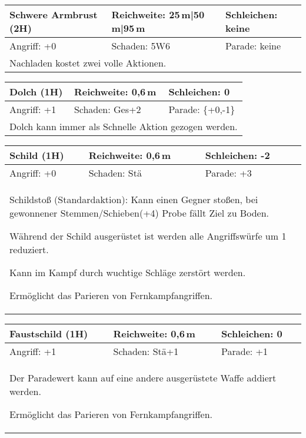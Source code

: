 \documentclass[../../Heldenanleitung2]{subfiles}
\begin{document}
\begin{tabular}{|p{}|p{}|p{}|}
\hline
\textbf{Schwere Armbrust (2H)} & Reichweite: 25\,m|50\,m|95\,m & Schleichen: keine\\
\hline
Angriff: +0 & Schaden: 5W6 & Parade: keine\\
\hline
\multicolumn{3}{|p{0.99\textwidth}|}{Nachladen kostet zwei volle Aktionen.} \\
\hline
\end{tabular}
\newline \newline\newline
\begin{tabular}{|p{}|p{}|p{}|}
\hline
\textbf{Dolch (1H)} & Reichweite: 0,6\,m & Schleichen: 0\\
\hline
Angriff: +1 & Schaden: Ges+2 & Parade: \{+0,-1\}\\
\hline
\multicolumn{3}{|p{0.99\textwidth}|}{Dolch kann immer als Schnelle Aktion gezogen werden.} \\
\hline
\end{tabular}
\newline \newline\newline
\begin{tabular}{|p{}|p{}|p{}|}
\hline
\textbf{Schild (1H)} & Reichweite: 0,6\,m & Schleichen: -2 \\
\hline
Angriff: +0 & Schaden: Stä & Parade: +3\\
\hline
\multicolumn{3}{|p{0.99\textwidth}|}{Schildstoß (Standardaktion): Kann einen Gegner stoßen, bei gewonnener Stemmen/Schieben(+4) Probe fällt Ziel zu Boden. 

Während der Schild ausgerüstet ist werden alle Angriffswürfe um 1 reduziert.

Kann im Kampf durch wuchtige Schläge zerstört werden.

Ermöglicht das Parieren von Fernkampfangriffen.
}\\
\hline
\end{tabular}
\newline \newline\newline
\begin{tabular}{|p{}|p{}|p{}|}
\hline
\textbf{Faustschild (1H)} & Reichweite: 0,6\,m & Schleichen: 0 \\
\hline
Angriff: +1 & Schaden: Stä+1 & Parade: +1\\
\hline
\multicolumn{3}{|p{0.99\textwidth}|}{
Der Paradewert kann auf eine andere ausgerüstete Waffe addiert werden.

Ermöglicht das Parieren von Fernkampfangriffen.
} \\
\hline
\end{tabular}
\end{document}
